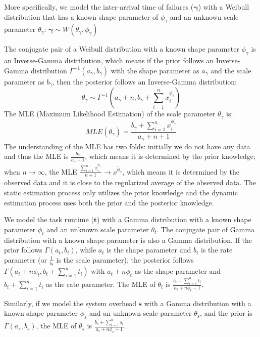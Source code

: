 \documentclass{IOS-Book-Article}
\begin{document}
More specifically, we model the inter-arrival time of failures ($\bm\gamma$) with a Weibull distribution that has a known shape parameter of $\phi_{\gamma}$ and an unknown scale parameter $\theta_{\gamma}$: $\bm\gamma\sim W(\theta_{\gamma}, \phi_{\gamma})$

The conjugate pair of a Weibull distribution with a known shape parameter $\phi_{\gamma}$ is an Inverse-Gamma distribution, which means if the prior follows an Inverse-Gamma distribution $\Gamma^{-1}(a_{\gamma}, b_{\gamma})$ with the shape parameter as $a_{\gamma}$ and the scale parameter as $b_{\gamma}$, then the posterior follows an Inverse-Gamma distribution:
\begin{equation}
\theta_{\gamma}\sim\Gamma^{-1}(a_{\gamma}+n,\displaystyle b_{\gamma}+\sum_{i=1}^n{x_i^{\phi_{\gamma}}})
\label{eq:theta-1}
 \end{equation}
The MLE (Maximum Likelihood Estimation) of the scale parameter $\theta_{\gamma}$ is:
\begin{equation}
MLE(\theta_{\gamma})=\displaystyle\frac{b_{\gamma}+\displaystyle\sum_{i=1}^n{x_i^{\phi_{\gamma}}}}{a_{\gamma}+n+1}
\end{equation}
The understanding of the MLE has two folds: initially we do not have any data and thus the MLE is $\displaystyle\frac{b_{\gamma}}{a_{\gamma}+1}$, which means it is determined by the prior knowledge; when $n\to\infty$, the MLE $\displaystyle\frac{\displaystyle\sum_{i=1}^n{x_i^{\phi_{\gamma}}}}{n+1}\to\overline{x^{\phi_{\gamma}}}$, which means it is determined by the observed data and it is close to the regularized average of the observed data. The static estimation process only utilizes the prior knowledge and the dynamic estimation process uses both the prior and the posterior knowledge. 

We model the task runtime ($\bm t$) with a Gamma distribution with a known shape parameter $\phi_{t}$ and an unknown scale parameter $\theta_t$. The conjugate pair of Gamma distribution with a known shape parameter is also a Gamma distribution. If the prior follows $\Gamma(a_t, b_t)$, while $a_t$ is the shape parameter and $b_t$ is the rate parameter (or $\displaystyle \frac{1}{b_t}$ is the scale parameter), the posterior follows $\Gamma(a_t+n\phi_t, b_t+\displaystyle\sum_{i=1}^n{t_i})$ with $a_t+n\phi_t$ as the shape parameter and $b_t+\displaystyle\sum_{i=1}^n{t_i}$ as the rate parameter. The MLE of $\theta_t$ is $\displaystyle\frac{b_t+\displaystyle\sum_{i=1}^n{t_i}}{a_t+n\phi_t-1}$. 

Similarly, if we model the system overhead $\bm s$ with a Gamma distribution with a known shape parameter $\phi_{s}$ and an unknown scale parameter $\theta_s$, and the prior is $\Gamma(a_s, b_s)$, the MLE of $\theta_s$ is $\displaystyle\frac{b_s+\displaystyle\sum_{i=1}^n{s_i}}{a_s+n\phi_s-1}$.
\end{document}
